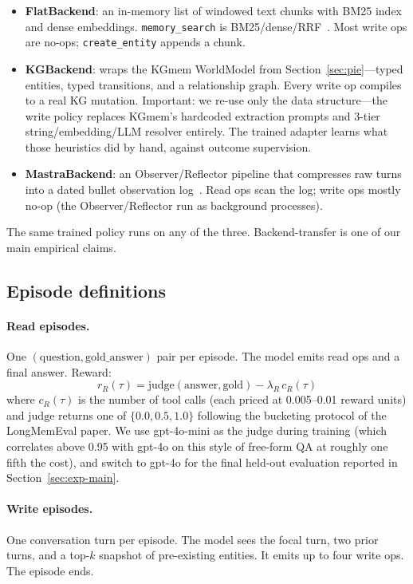 \documentclass[11pt]{article}
\begin{document}
\begin{itemize}
  \item \textbf{FlatBackend}: an in-memory list of windowed text chunks
    with BM25 index and dense embeddings. \texttt{memory\_search} is
    BM25/dense/RRF~\cite{shao2024deepseekmath}. Most write ops are
    no-ops; \texttt{create\_entity} appends a chunk.
  \item \textbf{KGBackend}: wraps the KGmem WorldModel from
    Section~\ref{sec:pie}---typed entities, typed transitions, and a
    relationship graph. Every write op compiles to a real KG mutation.
    Important: we re-use only the data structure---the write policy
    replaces KGmem's hardcoded extraction prompts and 3-tier
    string/embedding/LLM resolver entirely. The trained adapter learns
    what those heuristics did by hand, against outcome supervision.
  \item \textbf{MastraBackend}: an Observer/Reflector pipeline that
    compresses raw turns into a dated bullet observation
    log~\cite{mastra2025om}. Read ops scan the log; write ops mostly
    no-op (the Observer/Reflector run as background processes).
\end{itemize}

The same trained policy runs on any of the three. Backend-transfer
is one of our main empirical claims.

\subsection{Episode definitions}

\paragraph{Read episodes.} One $(\text{question}, \text{gold\_answer})$
pair per episode. The model emits read ops and a final answer. Reward:
\[
  r_R(\tau) = \mathrm{judge}(\text{answer}, \text{gold}) - \lambda_R\,c_R(\tau)
\]
where $c_R(\tau)$ is the number of tool calls (each priced at
0.005--0.01 reward units) and $\mathrm{judge}$ returns one of
$\{0.0, 0.5, 1.0\}$ following the bucketing protocol of the
LongMemEval paper. We use gpt-4o-mini as the judge during training
(which correlates above 0.95 with gpt-4o on this style of free-form QA
at roughly one fifth the cost), and switch to gpt-4o for the final
held-out evaluation reported in Section~\ref{sec:exp-main}.

\paragraph{Write episodes.} One conversation turn per episode. The
model sees the focal turn, two prior turns, and a top-$k$ snapshot of
pre-existing entities. It emits up to four write ops. The episode ends.
\end{document}
